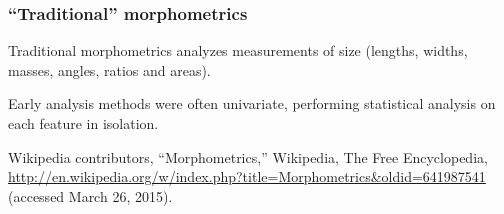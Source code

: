 \begin{frame}
\frametitle{``Traditional'' morphometrics}
Traditional morphometrics analyzes measurements of size (lengths, widths, masses, angles, ratios and areas).

Early analysis methods were often univariate, performing statistical analysis on each feature in isolation.

\vspace{0.25cm}
\begin{tiny}
Wikipedia contributors, ``Morphometrics,'' Wikipedia, The Free Encyclopedia, \url{http://en.wikipedia.org/w/index.php?title=Morphometrics&oldid=641987541} (accessed March 26, 2015).\par
\end{tiny}
\end{frame}



